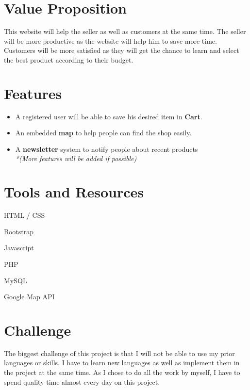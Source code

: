 \documentclass[12pt]{article}
\begin{document}
\section*{Value Proposition}
This website will help the seller as well as customers at the same time. The seller will be more productive as the website will help him to save more time. Customers will be more satisfied as they will get the chance to learn and select the best product according to their budget.

\section*{Features}
\begin{itemize}
\item  A registered user will be able to save his desired item in \textbf{Cart}.
\item  An embedded \textbf{map} to help people can find the shop easily.
\item  A \textbf{newsletter} system to notify people about recent products \\ 
\textit{*(More features will be added if possible)}
\end{itemize}

\section*{Tools and Resources}
\begin{itemize}
\begin{multicols}{2}
\item  HTML / CSS
\item  Bootstrap
\item  Javascript
\item  PHP
\item  MySQL
\item  Google Map API
\end{multicols}
\end{itemize}
\section*{Challenge} 
The biggest challenge of this project is that I will not be able to use my prior languages or skills. I have to learn new languages as well as implement them in the project at the same time. As I chose to do all the work by myself, I have to spend quality time almost every day on this project.
\end{document}
